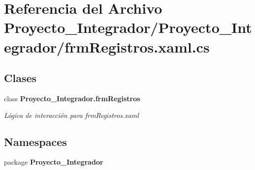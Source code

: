 \section{Referencia del Archivo Proyecto\-\_\-\-Integrador/\-Proyecto\-\_\-\-Integrador/frm\-Registros.xaml.\-cs}
\label{frm_registros_8xaml_8cs}
\subsection*{Clases}
\begin{DoxyCompactItemize}
\item 
class {\bf Proyecto\-\_\-\-Integrador.\-frm\-Registros}
\begin{DoxyCompactList}\small\item\em Lógica de interacción para frm\-Registros.\-xaml \end{DoxyCompactList}\end{DoxyCompactItemize}
\subsection*{Namespaces}
\begin{DoxyCompactItemize}
\item 
package {\bf Proyecto\-\_\-\-Integrador}
\end{DoxyCompactItemize}
